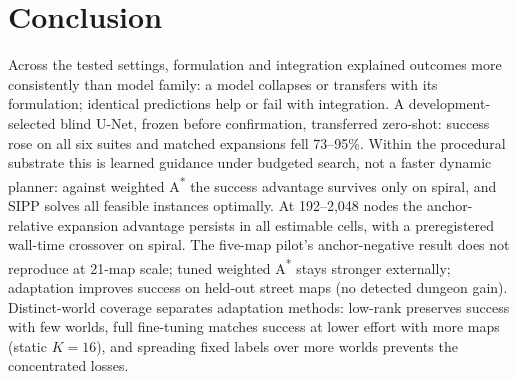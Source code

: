 \documentclass[letterpaper]{article} %
\begin{document}
\section{Conclusion}

 Across the tested settings, formulation and integration explained outcomes more consistently than model family: a model collapses or transfers with its formulation; identical predictions help or fail with integration. A development-selected blind U-Net, frozen before confirmation, transferred zero-shot: success rose on all six suites and matched expansions fell 73--95\%.  Within the procedural substrate this is learned guidance under budgeted search, not a faster dynamic planner: against weighted A\textsuperscript{*} the success advantage survives only on spiral, and SIPP solves all feasible instances optimally. At 192--2{,}048 nodes the anchor-relative expansion advantage persists in all estimable cells, with a preregistered wall-time crossover on spiral. The five-map pilot's anchor-negative result does not reproduce at 21-map scale; tuned weighted A\textsuperscript{*} stays stronger externally; adaptation improves success on held-out street maps (no detected dungeon gain). Distinct-world coverage separates adaptation methods: low-rank preserves success with few worlds, full fine-tuning matches success at lower effort with more maps (static $K{=}16$), and spreading fixed labels over more worlds prevents the concentrated losses.

\clearpage


\end{document}
